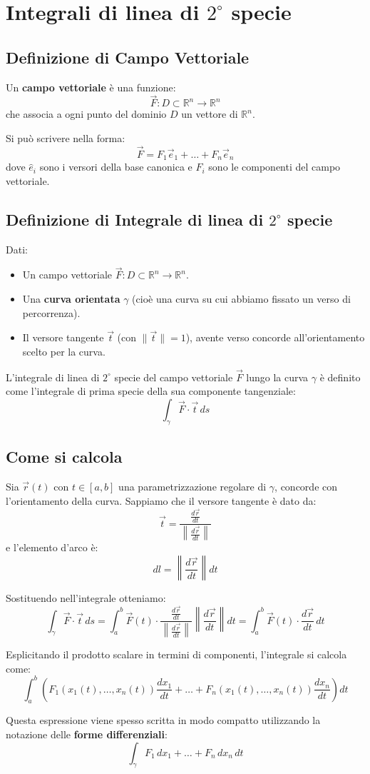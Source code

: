 \chapter{Integrali di linea di $2^\circ$ specie}

\section{Definizione di Campo Vettoriale}
Un \textbf{campo vettoriale} è una funzione:
$$\vec{F}: D \subset \mathbb{R}^n \rightarrow \mathbb{R}^n$$
che associa a ogni punto del dominio $D$ un vettore di $\mathbb{R}^n$.

Si può scrivere nella forma:
$$\vec{F} = F_1 \vec{e}_1 + \dots + F_n \vec{e}_n$$
dove $\hat{e}_i$ sono i versori della base canonica e $F_i$ sono le componenti del campo vettoriale.

\section{Definizione di Integrale di linea di $2^\circ$ specie}
Dati:
\begin{itemize}
    \item Un campo vettoriale $\vec{F}: D \subset \mathbb{R}^n \rightarrow \mathbb{R}^n$.
    \item Una \textbf{curva orientata} $\gamma$ (cioè una curva su cui abbiamo fissato un verso di percorrenza).
    \item Il versore tangente $\vec{t}$ (con $\|\vec{t}\| = 1$), avente verso concorde all'orientamento scelto per la curva.
\end{itemize}

L'integrale di linea di $2^\circ$ specie del campo vettoriale $\vec{F}$ lungo la curva $\gamma$ è definito come l'integrale di prima specie della sua componente tangenziale:
$$\int_{\gamma} \vec{F} \cdot \vec{t} \, ds$$

\section{Come si calcola}
Sia $\vec{r}(t)$ con $t \in [a,b]$ una parametrizzazione regolare di $\gamma$, concorde con l'orientamento della curva. 
Sappiamo che il versore tangente è dato da:
$$\vec{t} = \frac{\frac{d\vec{r}}{dt}}{\left\| \frac{d\vec{r}}{dt} \right\|}$$
e l'elemento d'arco è:
$$dl = \left\| \frac{d\vec{r}}{dt} \right\| dt$$

Sostituendo nell'integrale otteniamo:
$$\int_{\gamma} \vec{F} \cdot \vec{t} \, ds = \int_{a}^{b} \vec{F}(t) \cdot \frac{\frac{d\vec{r}}{dt}}{\left\| \frac{d\vec{r}}{dt} \right\|} \left\| \frac{d\vec{r}}{dt} \right\| dt = \int_{a}^{b} \vec{F}(t) \cdot \frac{d\vec{r}}{dt} \, dt$$

Esplicitando il prodotto scalare in termini di componenti, l'integrale si calcola come:
$$\int_{a}^{b} \left( F_1(x_1(t), \dots, x_n(t))\frac{dx_1}{dt} + \dots + F_n(x_1(t), \dots, x_n(t))\frac{dx_n}{dt} \right) dt$$

Questa espressione viene spesso scritta in modo compatto utilizzando la notazione delle \textbf{forme differenziali}:
$$\int_{\gamma} F_1 \, dx_1 + \dots + F_n \, dx_n \, dt$$

